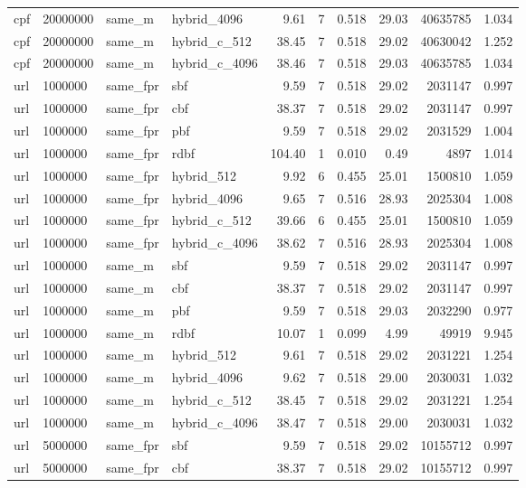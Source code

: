 \begin{tabular}{llllrrrrrr}
cpf & 20000000 & same\_m & hybrid\_4096 & 9.61 & 7 & 0.518 & 29.03 & 40635785 & 1.034 \\
cpf & 20000000 & same\_m & hybrid\_c\_512 & 38.45 & 7 & 0.518 & 29.02 & 40630042 & 1.252 \\
cpf & 20000000 & same\_m & hybrid\_c\_4096 & 38.46 & 7 & 0.518 & 29.03 & 40635785 & 1.034 \\
url & 1000000 & same\_fpr & sbf & 9.59 & 7 & 0.518 & 29.02 & 2031147 & 0.997 \\
url & 1000000 & same\_fpr & cbf & 38.37 & 7 & 0.518 & 29.02 & 2031147 & 0.997 \\
url & 1000000 & same\_fpr & pbf & 9.59 & 7 & 0.518 & 29.02 & 2031529 & 1.004 \\
url & 1000000 & same\_fpr & rdbf & 104.40 & 1 & 0.010 & 0.49 & 4897 & 1.014 \\
url & 1000000 & same\_fpr & hybrid\_512 & 9.92 & 6 & 0.455 & 25.01 & 1500810 & 1.059 \\
url & 1000000 & same\_fpr & hybrid\_4096 & 9.65 & 7 & 0.516 & 28.93 & 2025304 & 1.008 \\
url & 1000000 & same\_fpr & hybrid\_c\_512 & 39.66 & 6 & 0.455 & 25.01 & 1500810 & 1.059 \\
url & 1000000 & same\_fpr & hybrid\_c\_4096 & 38.62 & 7 & 0.516 & 28.93 & 2025304 & 1.008 \\
url & 1000000 & same\_m & sbf & 9.59 & 7 & 0.518 & 29.02 & 2031147 & 0.997 \\
url & 1000000 & same\_m & cbf & 38.37 & 7 & 0.518 & 29.02 & 2031147 & 0.997 \\
url & 1000000 & same\_m & pbf & 9.59 & 7 & 0.518 & 29.03 & 2032290 & 0.977 \\
url & 1000000 & same\_m & rdbf & 10.07 & 1 & 0.099 & 4.99 & 49919 & 9.945 \\
url & 1000000 & same\_m & hybrid\_512 & 9.61 & 7 & 0.518 & 29.02 & 2031221 & 1.254 \\
url & 1000000 & same\_m & hybrid\_4096 & 9.62 & 7 & 0.518 & 29.00 & 2030031 & 1.032 \\
url & 1000000 & same\_m & hybrid\_c\_512 & 38.45 & 7 & 0.518 & 29.02 & 2031221 & 1.254 \\
url & 1000000 & same\_m & hybrid\_c\_4096 & 38.47 & 7 & 0.518 & 29.00 & 2030031 & 1.032 \\
url & 5000000 & same\_fpr & sbf & 9.59 & 7 & 0.518 & 29.02 & 10155712 & 0.997 \\
url & 5000000 & same\_fpr & cbf & 38.37 & 7 & 0.518 & 29.02 & 10155712 & 0.997 \\

\end{tabular}
